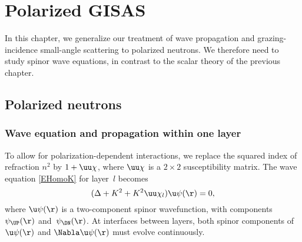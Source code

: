 
\chapter{Polarized GISAS}  \label{SPol}

In this chapter,
we generalize our treatment of wave propagation and
grazing-incidence small-angle scattering
to polarized neutrons.
We therefore need to study spinor wave equations,
in contrast to the scalar theory of the previous chapter.

\MissingSection
\iffalse
\section{Polarized neutrons}\label{Snpol}




\subsection{Wave equation and propagation within one layer}


To allow for polarization-dependent interactions,
we replace the squared index of refraction $n^2$
by $1+\uu\chi$, where $\uu\chi$ is a $2\times 2$ susceptibility matrix.
The wave equation \cref{EHomoK} for layer~$l$ becomes
\begin{equation}\label{Ewaveqp}
(\Delta +K^2 +K^2 \uu\chi_l) \u\psi(\r)= 0,
\end{equation}
where $\u\psi(\r)$ is a two-component spinor wavefunction,
with components $\psi_\UP(\r)$ and~$\psi_\DN(\r)$.
At interfaces between layers,
both spinor components of $\u\psi(\r)$ and $\Nabla\u\psi(\r)$
must evolve continuously.

